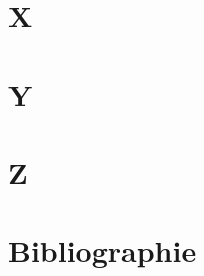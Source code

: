 \documentclass[10.5pt,a4paper]{article}
\begin{document}
\section*{X}

\section*{Y}

\section*{Z}


\section{Bibliographie}
\begingroup
\renewcommand{\section}[2]{}


\vspace{10cm}
\endgroup
\end{document}
